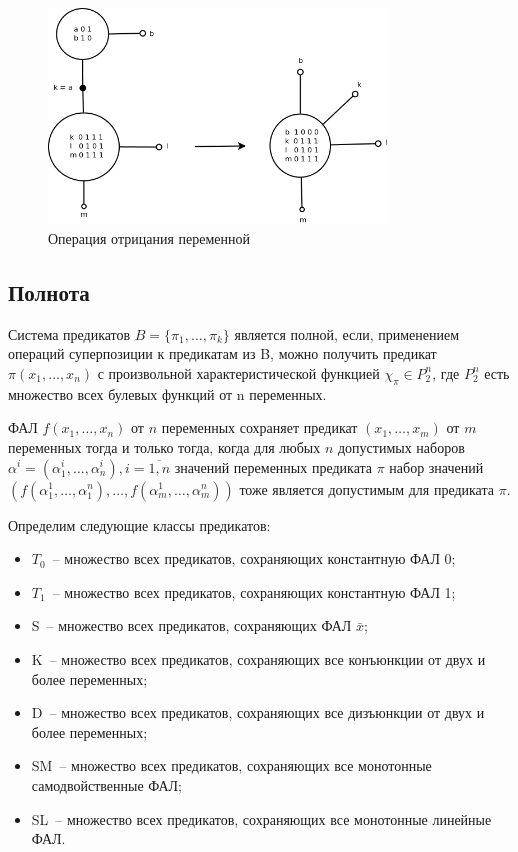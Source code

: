 \documentclass[12pt]{extarticle}
\newenvironment{definition}[1][Определение.]{\begin{trivlist}
\item[\hskip \labelsep {\bfseries #1}]}{\end{trivlist}}
\begin{document}
\begin{itemize}
    \begin{figure}[htb]
    \centering
    \includegraphics[width=0.8\textwidth]{join_neg_op.png}
    \caption{Операция отрицания переменной}
    \label{fig:join_neg_op}
    \end{figure}

\end{itemize}
\subsection{Полнота}

\begin{definition}
Система предикатов $B = \{ \pi_1, \dots, \pi_k \}$ является полной, если, 
применением операций суперпозиции к предикатам из B, можно получить 
предикат $\pi(x_1, \dots, x_n)$ с произвольной характеристической 
функцией $\chi_{\pi} \in P_2^n$, где $P_2^n$ есть множество всех булевых функций от n переменных.
\end{definition}

\begin{definition} ФАЛ
$f (x_1, \ldots, x_n)$ от $n$ переменных сохраняет предикат $ (x_1, \ldots, x_m)$ от $m$
переменных тогда и только тогда, когда для любых $n$ допустимых наборов $\alpha^i = (\alpha_1^i, \ldots, \alpha_n^i), 
i = \overline{1, n}$ значений переменных предиката $\pi$ набор
значений $( f(\alpha_1^1, \ldots, \alpha_1^n), \ldots, f(\alpha_m^1, \ldots, \alpha_m^n) )$
тоже является допустимым для предиката $\pi$.
\end{definition}

Определим следующие классы предикатов:
\begin{itemize}
    \item{$T_0$}~-- множество всех предикатов, сохраняющих константную ФАЛ 0;
    \item{$T_1$}~-- множество всех предикатов, сохраняющих константную ФАЛ 1;
    \item{S}~-- множество всех предикатов, сохраняющих ФАЛ $\bar{x}$;
    \item{K}~-- множество всех предикатов, сохраняющих все конъюнкции от двух и более переменных;
    \item{D}~-- множество всех предикатов, сохраняющих все дизъюнкции от двух и более переменных;
    \item{SM}~-- множество всех предикатов, сохраняющих все монотонные самодвойственные ФАЛ;
    \item{SL}~-- множество всех предикатов, сохраняющих все монотонные линейные ФАЛ.
\end{itemize}
\end{document}
